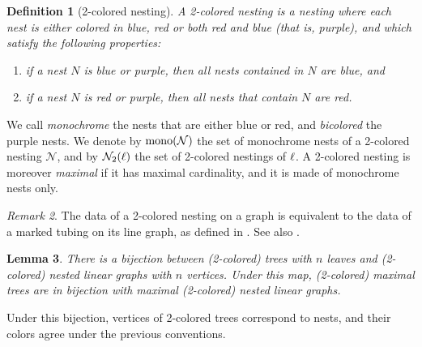 \documentclass[twoside, 11pt]{amsart}
\newtheorem{definition}{Definition}[section]
\newtheorem{lemma}[definition]{Lemma}
\theoremstyle{remark}
\newtheorem{remark}[definition]{\sc Remark}
\begin{document}
\begin{definition}[2-colored nesting] 
A \emph{2-colored nesting} is a nesting where each nest is either colored in blue, red or both red and blue (that is, purple), and which satisfy the following properties: 
\begin{enumerate}[leftmargin=*]
\item if a nest $N$ is blue or purple, then all nests contained in $N$ are blue, and 
\item if a nest $N$ is red or purple, then all nests that contain $N$ are red.
\end{enumerate}
\end{definition}
We call \emph{monochrome} the nests that are either blue or red, and \emph{bicolored} the purple nests. 
We denote by $\mathrm{mono}(\mathcal{N})$ the set of monochrome nests of a 2-colored nesting $\mathcal{N}$, and by $\mathcal{N}_2(\ell)$ the set of 2-colored nestings of $\ell$.
A 2-colored nesting is moreover \emph{maximal} if it has maximal cardinality, and it is made of monochrome nests only. 

\begin{remark} 
The data of a 2-colored nesting on a graph is equivalent to the data of a marked tubing on its line graph, as defined in \cite{DevadossForcey08}. See also \cite[Remark 2.4]{LA21}.
\end{remark}

\begin{lemma} 
\label{lemma:bijection}
There is a bijection between (2-colored) trees with $n$ leaves and (2-colored) nested linear graphs with $n$ vertices. 
Under this map, (2-colored) maximal trees are in bijection with maximal (2-colored) nested linear graphs.
\end{lemma}

\noindent Under this bijection, vertices of 2-colored trees correspond to nests, and their colors agree under the previous conventions. 
\end{document}
